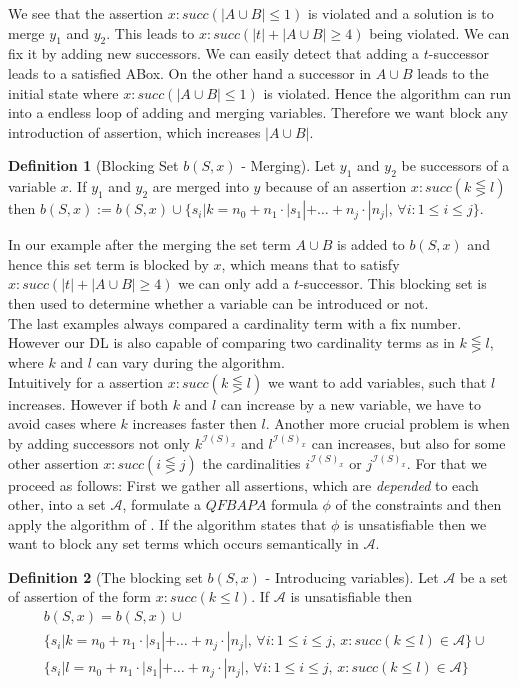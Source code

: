 \documentclass[a4paper,11pt]{scrartcl}
\theoremstyle{break}
\theoremstyle{definition}
\newtheorem{mydef}{Definition}
\newcommand{\RM}[1]{\MakeUppercase{\romannumeral #1{}}}
\begin{document}
We see that the assertion $x:succ(|A\cup B|\leq 1)$ is violated and a solution is to merge $y_1$ and $y_2$. This leads to $x:succ(|t|+|A\cup B|\geq 4)$ being violated. We can fix it by adding new successors. We can easily detect that adding a $t$-successor leads to a satisfied ABox. On the other hand a successor in $A\cup B$ leads to the initial state where $x:succ(|A\cup B|\leq 1)$ is violated. Hence the algorithm can run into a endless loop of adding and merging variables. Therefore we want block any introduction of assertion, which increases $|A\cup B|$.
\begin{mydef}[Blocking Set $b(S,x)$ \RM{2} - Merging]
Let $y_1$ and $y_2$ be successors of a variable $x$. If $y_1$ and $y_2$ are merged into $y$ because of an assertion $x:succ(k\lesseqgtr l)$ then $b(S,x):=b(S,x)\cup\{s_i|k=n_0+n_1\cdot|s_1|+\dots+n_j\cdot|n_j|,\,\forall i:1\leq i\leq j\}$.
\end{mydef}
In our example after the merging the set term $A\cup B$ is added to $b(S,x)$ and hence this set term is blocked by $x$, which means that to satisfy $x:succ(|t|+|A\cup B|\geq 4)$ we can only add a $t$-successor. This blocking set is then used to determine whether a variable can be introduced or not.\\
The last examples always compared a cardinality term with a fix number. However our DL is also capable of comparing two cardinality terms as in $k\lesseqgtr l$, where $k$ and $l$ can vary during the algorithm.\\
Intuitively for a assertion $x:succ(k\lesseqgtr l)$ we want to add variables, such that $l$ increases. However if both $k$ and $l$ can increase by a new variable, we have to avoid cases where $k$ increases faster then $l$. Another more crucial problem is when by adding successors not only $k^{\mathcal{I}(S)_x}$ and $l^{\mathcal{I}(S)_x}$ can increases, but also for some other assertion $x:succ(i\lesseqgtr j)$ the cardinalities $i^{\mathcal{I}(S)_x}$ or $j^{\mathcal{I}(S)_x}$. For that we proceed as follows:
First we gather all assertions, which are \textit{depended} to each other, into a set $\mathcal{A}$, formulate a $QFBAPA$ formula $\phi$ of the constraints and then apply the algorithm of \cite{4}. If the algorithm states that $\phi$ is unsatisfiable then we want to block any set terms which occurs semantically in $\mathcal{A}$.
\begin{mydef}[The blocking set $b(S,x)$ \RM{3} - Introducing variables]
Let $\mathcal{A}$ be a set of assertion of the form $x:succ(k\leq l)$. If $\mathcal{A}$ is unsatisfiable then
\begin{align*}
&b(S,x)=b(S,x)\cup\\
&\{s_i|k=n_0+n_1\cdot|s_1|+\dots+n_j\cdot|n_j|,\,\forall i:1\leq i\leq j,\, x:succ(k\leq l)\in\mathcal{A}\}\cup\\
&\{s_i|l=n_0+n_1\cdot|s_1|+\dots+n_j\cdot|n_j|,\,\forall i:1\leq i\leq j,\, x:succ(k\leq l)\in\mathcal{A}\}
\end{align*}
\end{mydef}
\end{document}
